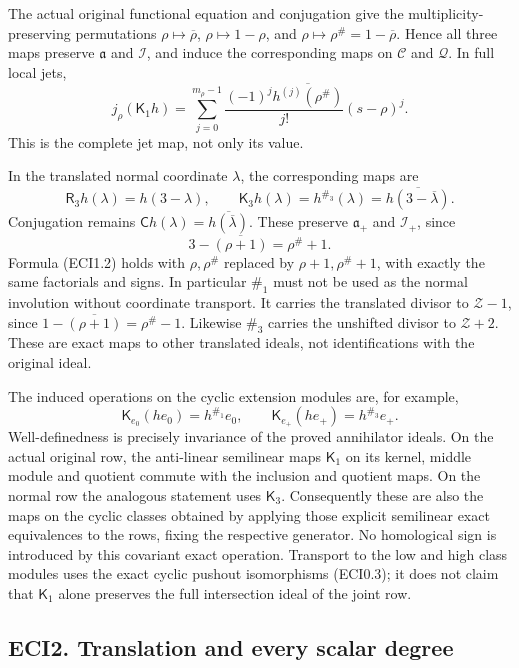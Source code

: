The actual original functional equation and conjugation give the
multiplicity-preserving permutations \(\rho\mapsto\overline\rho\),
\(\rho\mapsto1-\rho\), and \(\rho\mapsto\rho^\#=1-\overline\rho\). Hence
all three maps preserve \(\mathfrak a\) and \(\mathcal I\), and induce
the corresponding maps on \(\mathscr C\) and \(\mathcal Q\). In full
local jets, \[
j_\rho(\mathsf K_1h)=
\sum_{j=0}^{m_\rho-1}
\frac{(-1)^j\overline{h^{(j)}(\rho^\#)}}{j!}(s-\rho)^j.
\tag{ECI1.2}
\] This is the complete jet map, not only its value.

In the translated normal coordinate \(\lambda\), the corresponding maps
are \[
\mathsf R_3h(\lambda)=h(3-\lambda),\qquad
\mathsf K_3h(\lambda)=h^{\#_3}(\lambda)=
\overline{h(3-\overline\lambda)}.
\tag{ECI1.3}
\] Conjugation remains
\(\mathsf C h(\lambda)=\overline{h(\overline\lambda)}\). These preserve
\(\mathfrak a_+\) and \(\mathcal I_+\), since \[
3-\overline{(\rho+1)}=\rho^\#+1.
\tag{ECI1.4}
\] Formula (ECI1.2) holds with \(\rho,\rho^\#\) replaced by
\(\rho+1,\rho^\#+1\), with exactly the same factorials and signs. In
particular \(\#_1\) must not be used as the normal involution without
coordinate transport. It carries the translated divisor to
\(\mathscr Z-1\), since \(1-\overline{(\rho+1)}=\rho^\#-1\). Likewise
\(\#_3\) carries the unshifted divisor to \(\mathscr Z+2\). These are
exact maps to other translated ideals, not identifications with the
original ideal.

The induced operations on the cyclic extension modules are, for example,
\[
\mathsf K_{e_0}(h e_0)=h^{\#_1}e_0,
\qquad
\mathsf K_{e_+}(h e_+)=h^{\#_3}e_+.
\tag{ECI1.5}
\] Well-definedness is precisely invariance of the proved annihilator
ideals. On the actual original row, the anti-linear semilinear maps
\(\mathsf K_1\) on its kernel, middle module and quotient commute with
the inclusion and quotient maps. On the normal row the analogous
statement uses \(\mathsf K_3\). Consequently these are also the maps on
the cyclic classes obtained by applying those explicit semilinear exact
equivalences to the rows, fixing the respective generator. No
homological sign is introduced by this covariant exact operation.
Transport to the low and high class modules uses the exact cyclic
pushout isomorphisms (ECI0.3); it does not claim that \(\mathsf K_1\)
alone preserves the full intersection ideal of the joint row.

\subsection{ECI2. Translation and every scalar
degree}\label{eci2.-translation-and-every-scalar-degree}


